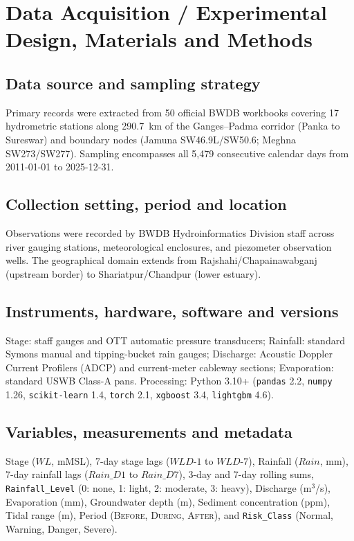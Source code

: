\documentclass[11pt,a4paper]{article}
\begin{document}
\section{Data Acquisition / Experimental Design, Materials and Methods}

\subsection{Data source and sampling strategy}
Primary records were extracted from 50 official BWDB workbooks covering 17 hydrometric stations along 290.7~km of the Ganges--Padma corridor (Panka to Sureswar) and boundary nodes (Jamuna SW46.9L/SW50.6; Meghna SW273/SW277). Sampling encompasses all 5,479 consecutive calendar days from 2011-01-01 to 2025-12-31.

\subsection{Collection setting, period and location}
Observations were recorded by BWDB Hydroinformatics Division staff across river gauging stations, meteorological enclosures, and piezometer observation wells. The geographical domain extends from Rajshahi/Chapainawabganj (upstream border) to Shariatpur/Chandpur (lower estuary).

\subsection{Instruments, hardware, software and versions}
Stage: staff gauges and OTT automatic pressure transducers; Rainfall: standard Symons manual and tipping-bucket rain gauges; Discharge: Acoustic Doppler Current Profilers (ADCP) and current-meter cableway sections; Evaporation: standard USWB Class-A pans. Processing: Python 3.10+ (\texttt{pandas} 2.2, \texttt{numpy} 1.26, \texttt{scikit-learn} 1.4, \texttt{torch} 2.1, \texttt{xgboost} 3.4, \texttt{lightgbm} 4.6).

\subsection{Variables, measurements and metadata}
Stage ($WL$, mMSL), 7-day stage lags ($WLD\text{-}1$ to $WLD\text{-}7$), Rainfall ($Rain$, mm), 7-day rainfall lags ($Rain\_D1$ to $Rain\_D7$), 3-day and 7-day rolling sums, \texttt{Rainfall\_Level} (0: none, 1: light, 2: moderate, 3: heavy), Discharge (m$^3$/s), Evaporation (mm), Groundwater depth (m), Sediment concentration (ppm), Tidal range (m), Period (\textsc{Before}, \textsc{During}, \textsc{After}), and \texttt{Risk\_Class} (Normal, Warning, Danger, Severe).
\end{document}
